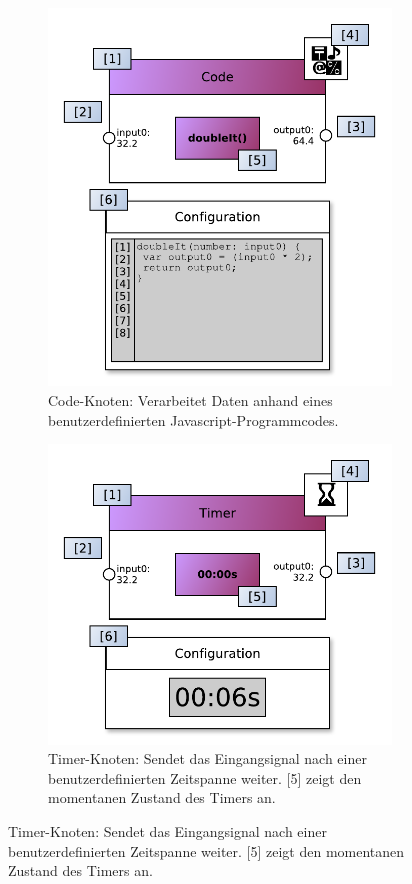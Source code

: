 \begin{figure}[h]
\begin{subfigure}{.5\textwidth}
  \centering
  \includegraphics[width=1\linewidth]{bilder/Anhang/instancecodefunctionnode.pdf}
  \caption{Code-Knoten: Verarbeitet Daten anhand eines benutzerdefinierten Javascript-Programmcodes.}
  \label{fig:actorgeneric}
\end{subfigure}%
\begin{subfigure}{.5\textwidth}
  \centering
  \includegraphics[width=1\linewidth]{bilder/Anhang/instancetimerfunctionnode.pdf}
  \caption{Timer-Knoten: Sendet das Eingangsignal nach einer benutzerdefinierten Zeitspanne weiter. [5] zeigt den momentanen Zustand des Timers an.}
  \label{fig:actorled}
\end{subfigure}





\end{figure}
